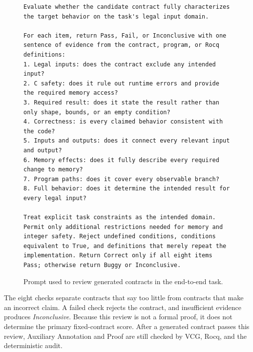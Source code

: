 \begin{figure}[!t]
\centering
\begin{minipage}{0.96\textwidth}
\begin{lstlisting}[style=artifact,basicstyle=\ttfamily\scriptsize,
  xleftmargin=0.4em,xrightmargin=0.4em]
Evaluate whether the candidate contract fully characterizes the target behavior on the task's legal input domain.

For each item, return Pass, Fail, or Inconclusive with one sentence of evidence from the contract, program, or Rocq definitions:
1. Legal inputs: does the contract exclude any intended input?
2. C safety: does it rule out runtime errors and provide the required memory access?
3. Required result: does it state the result rather than only shape, bounds, or an empty condition?
4. Correctness: is every claimed behavior consistent with the code?
5. Inputs and outputs: does it connect every relevant input and output?
6. Memory effects: does it fully describe every required change to memory?
7. Program paths: does it cover every observable branch?
8. Full behavior: does it determine the intended result for every legal input?

Treat explicit task constraints as the intended domain. Permit only additional restrictions needed for memory and integer safety. Reject undefined conditions, conditions equivalent to True, and definitions that merely repeat the implementation. Return Correct only if all eight items Pass; otherwise return Buggy or Inconclusive.
\end{lstlisting}
\end{minipage}
\caption{Prompt used to review generated contracts in the end-to-end task.}
\label{fig:app-judge-prompt}
\end{figure}

The eight checks separate contracts that say too little from contracts that make an incorrect claim. A failed check rejects the contract, and insufficient evidence produces \emph{Inconclusive}. Because this review is not a formal proof, it does not determine the primary fixed-contract score. After a generated contract passes this review, Auxiliary Annotation and Proof are still checked by VCG, Rocq, and the deterministic audit.

